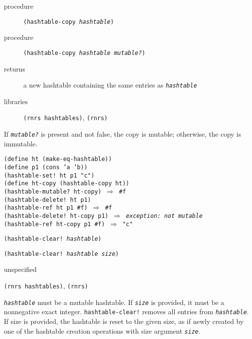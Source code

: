 \begin{description}

\label{objects_s286}\item[procedure] \texttt{(hashtable-copy \textit{hashtable})}



\item[procedure] \texttt{(hashtable-copy \textit{hashtable} \textit{mutable?})}



\item[returns] a new hashtable containing the same entries as \texttt{\textit{hashtable}}


\item[libraries] \texttt{(rnrs hashtables)}, \texttt{(rnrs)}
\end{description}


If \texttt{\textit{mutable?}} is present and not false, the copy is mutable;
otherwise, the copy is immutable.


\begin{alltt}
(define ht (make-eq-hashtable))
(define p1 (cons 'a 'b))
(hashtable-set! ht p1 "c")
(define ht-copy (hashtable-copy ht))
(hashtable-mutable? ht-copy) \(\Rightarrow\) \#{}f
(hashtable-delete! ht p1)
(hashtable-ref ht p1 \#{}f) \(\Rightarrow\) \#{}f
(hashtable-delete! ht-copy p1) \(\Rightarrow\) \textit{exception: not mutable}
(hashtable-ref ht-copy p1 \#{}f) \(\Rightarrow\) "c"
\end{alltt}

\begin{description}

\label{objects_s287}\item[procedure] \texttt{(hashtable-clear! \textit{hashtable})}



\item[procedure] \texttt{(hashtable-clear! \textit{hashtable} \textit{size})}



\item[returns] unspecified


\item[libraries] \texttt{(rnrs hashtables)}, \texttt{(rnrs)}
\end{description}

\texttt{\textit{hashtable}} must be a mutable hashtable.
If \texttt{\textit{size}} is provided, it must be a nonnegative exact integer.
\texttt{hashtable-clear!} removes all entries from \texttt{\textit{hashtable}}.
If size is provided, the hashtable is reset to the given size,
as if newly created by one of the hashtable creation operations
with size argument \texttt{\textit{size}}.


